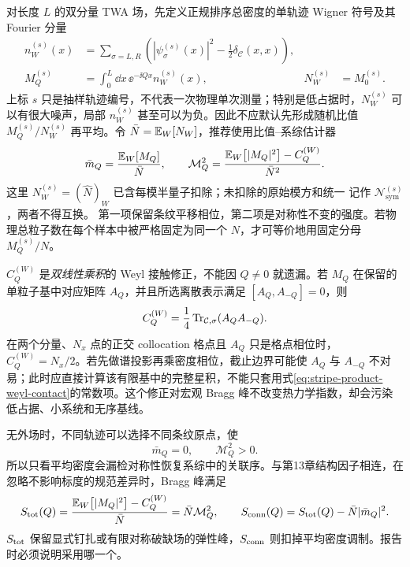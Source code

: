 对长度 $L$ 的双分量 TWA 场，先定义正规排序总密度的单轨迹 Wigner 符号及其 Fourier 分量
\begin{equation}
  \begin{aligned}
  n_W^{(s)}(x)&=\sum_{\sigma=L,R}
  \left(|\psi_\sigma^{(s)}(x)|^2-\frac12\delta_{\mathcal C}(x,x)\right),\\
  M_Q^{(s)}&=\int_0^L\dd x\,\ee^{-\ii Qx}n_W^{(s)}(x),
  &N_W^{(s)}&=M_0^{(s)}.
  \end{aligned}
  \label{eq:trajectory-stripe-fourier-symbol}
\end{equation}
上标 $s$ 只是抽样轨迹编号，不代表一次物理单次测量；特别是低占据时，$N_W^{(s)}$ 可以有很大噪声，局部 $n_W^{(s)}$ 甚至可以为负。因此不应默认先形成随机比值 $M_Q^{(s)}/N_W^{(s)}$ 再平均。令 $\bar N=\mathbb{E}_{W}\!\left[N_W\right]$，推荐使用比值--系综估计器
\begin{equation}
  \bar m_Q=\frac{\mathbb{E}_{W}\!\left[M_Q\right]}{\bar N},
  \qquad
  \mathcal M_Q^2=
  \frac{\mathbb{E}_{W}\!\left[|M_Q|^2\right]-C_Q^{(W)}}{\bar N^2}.
  \label{eq:ensemble-stripe-estimators}
\end{equation}
这里 $N_W^{(s)}=(\hat N)_W$ 已含每模半量子扣除；未扣除的原始模方和统一
记作 $\mathcal N_{\mathrm{sym}}^{(s)}$，两者不得互换。
第一项保留条纹平移相位，第二项是对称性不变的强度。若物理总粒子数在每个样本中被严格固定为同一个 $N$，才可等价地用固定分母 $M_Q^{(s)}/N$。

$C_Q^{(W)}$ 是\emph{双线性乘积}的 Weyl 接触修正，不能因 $Q\neq0$ 就遗漏。若 $M_Q$ 在保留的单粒子基中对应矩阵 $A_Q$，并且所选离散表示满足 $[A_Q,A_{-Q}]=0$，则
\begin{equation}
  C_Q^{(W)}=\frac14\operatorname{Tr}_{\mathcal C,\sigma}(A_QA_{-Q}).
  \label{eq:stripe-product-weyl-contact}
\end{equation}
在两个分量、$N_x$ 点的正交 collocation 格点且 $A_Q$ 只是格点相位时，$C_Q^{(W)}=N_x/2$。若先做谱投影再乘密度相位，截止边界可能使 $A_Q$ 与 $A_{-Q}$ 不对易；此时应直接计算该有限基中的完整星积，不能只套用式\eqref{eq:stripe-product-weyl-contact}的常数项。这个修正对宏观 Bragg 峰不改变热力学指数，却会污染低占据、小系统和无序基线。

无外场时，不同轨迹可以选择不同条纹原点，使
\begin{equation}
  \bar m_Q=0,
  \qquad
  \mathcal M_Q^2>0.
  \label{eq:symmetry-restored-stripe-ensemble}
\end{equation}
所以只看平均密度会漏检对称性恢复系综中的关联序。与第13章结构因子相连，在忽略不影响标度的规范差异时，Bragg 峰满足
\begin{equation}
  S_{\rm tot}(Q)=\frac{\mathbb{E}_{W}\!\left[|M_Q|^2\right]-C_Q^{(W)}}{\bar N}
  =\bar N\mathcal M_Q^2,
  \qquad
  S_{\rm conn}(Q)=S_{\rm tot}(Q)-\bar N|\bar m_Q|^2.
  \label{eq:bragg-order-scaling}
\end{equation}
$S_{\rm tot}$ 保留显式钉扎或有限对称破缺场的弹性峰，$S_{\rm conn}$ 则扣掉平均密度调制。报告时必须说明采用哪一个。

